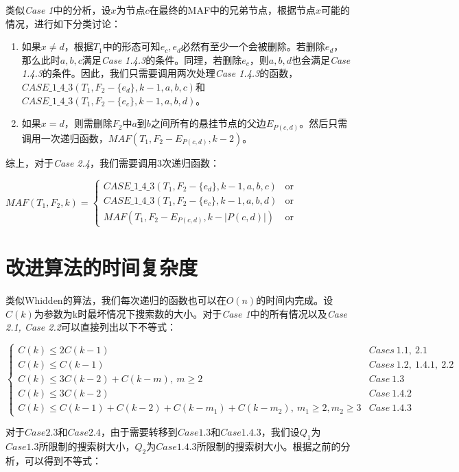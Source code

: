类似\textit{Case 1}中的分析，设$x$为节点$c$在最终的MAF中的兄弟节点，根据节点$x$可能的情况，进行如下分类讨论：
\begin{enumerate}
	\item 如果$x \neq d$，根据$T_1$中的形态可知$e_c,e_d$必然有至少一个会被删除。若删除$e_d$，那么此时$a,b,c$满足\textit{Case 1.4.3}的条件。同理，若删除$e_c$，则$a,b,d$也会满足\textit{Case 1.4.3}的条件。因此，我们只需要调用两次处理\textit{Case 1.4.3}的函数，$CASE\_1\_4\_3(T_1,F_2-\{e_d\},k-1,a,b,c)$和$CASE\_1\_4\_3(T_1,F_2-\{e_c\},k-1,a,b,d)$。
	\item 如果$x = d$，则需删除$F_2$中$a$到$b$之间所有的悬挂节点的父边$E_{P(c,d)}$。然后只需调用一次递归函数，$MAF(T_1,F_2-E_{P(c,d)},k-2)$。
\end{enumerate}

综上，对于\textit{Case 2.4}，我们需要调用3次递归函数：
\begin{center}
$MAF(T_1,F_2,k) = \left\{
\begin{array}{lr}
         CASE\_1\_4\_3(T_1,F_2-\{e_d\},k-1,a,b,c) & \mbox{or}\\ 
         CASE\_1\_4\_3(T_1,F_2-\{e_c\},k-1,a,b,d) & \mbox{or}\\
         MAF(T_1,F_2-E_{P(c,d)},k-|P(c,d)|) & \mbox{or}
\end{array}
\right.$
\end{center}


\section{改进算法的时间复杂度}

类似Whidden的算法，我们每次递归的函数也可以在$O(n)$的时间内完成。设$C(k)$为参数为k时最坏情况下搜索数的大小。对于\textit{Case 1}中的所有情况以及\textit{Case 2.1, Case 2.2}可以直接列出以下不等式：
\begin{center}
$\left\{
\begin{array}{lr}
	C(k) \le 2C(k-1) & Cases~1.1,~2.1\\
	C(k) \le C(k-1) &  Cases~1.2,~1.4.1,~2.2\\
	C(k) \le 3C(k-2) + C(k-m),~m \ge 2 & Case~1.3 \\
	C(k) \le 3C(k-2) & Case~1.4.2 \\
	C(k) \le C(k-1)+C(k-2) + C(k-m_1) + C(k-m_2),~m_1 \ge 2, m_2 \ge 3 & Case~1.4.3
\end{array}
\right.$
\end{center}

对于$Case 2.3$和$Case 2.4$，由于需要转移到$Case 1.3$和$Case 1.4.3$，我们设$Q_1$为$Case 1.3$所限制的搜索树大小，$Q_2$为$Case 1.4.3$所限制的搜索树大小。根据之前的分析，可以得到不等式：

